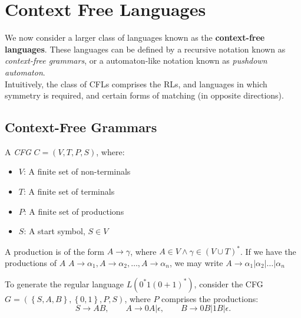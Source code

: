 \section{Context Free Languages}
We now consider a larger class of languages known as the \textbf{context-free
languages}. These languages can be defined by a recursive notation known as
\textit{context-free grammars}, or a automaton-like notation known as
\textit{pushdown automaton}.\\

Intuitively, the class of CFLs comprises the RLs, and languages in which
symmetry is required, and certain forms of matching (in opposite directions).

\subsection{Context-Free Grammars}
\begin{definition}[CFG]
  A \textit{CFG} $C=\left( V,T,P,S \right) $, where:
  \begin{itemize}
    \item $V$: A finite set of non-terminals
    \item $T$: A finite set of terminals
    \item $P$: A finite set of productions
    \item $S$: A start symbol, $S\in V$
  \end{itemize}
  A production is of the form $A\to\gamma$, where $A\in V\wedge \gamma\in
  {\left( V\cup T \right)} ^{*}$. If we have the productions
  of $A$ $A\to\alpha_1,A\to\alpha_2,\ldots,A\to\alpha_{n}$, we may write
  $A\to\alpha_1|\alpha_2|\ldots|\alpha_{n}$
\end{definition}
\begin{example}[$L(0^{*}1{(0+1)}^{*})$]
  To generate the regular language $L(0^{*}1{(0+1)}^{*})$, consider the CFG $G=\left(
  \left\{ S,A,B \right\},\left\{ 0,1 \right\},P,S \right) $, where $P$
  comprises the productions:
  \[S\to AB,\qquad A\to 0A|\epsilon,\qquad B\to 0B|1B|\epsilon.\] 
\end{example}

